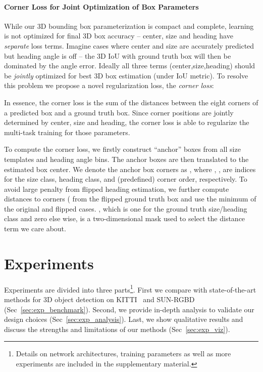\documentclass[10pt,twocolumn,letterpaper]{article}
\begin{document}
\paragraph{Corner Loss for Joint Optimization of Box Parameters}
While our 3D bounding box parameterization is compact and complete, learning is not optimized for final 3D box accuracy -- center, size and heading have \emph{separate} loss terms. Imagine cases where center and size are accurately predicted but heading angle is off -- the 3D IoU with ground truth box will then be dominated by the angle error. Ideally all three terms (center,size,heading) should be \emph{jointly} optimized for best 3D box estimation (under IoU metric).
To resolve this problem we propose a novel regularization loss, the \emph{corner loss}:

\vspace{-1mm}



In essence, the corner loss is the sum of the distances between the eight corners of a predicted box and a ground truth box. Since corner positions are jointly determined by center, size and heading, the corner loss is able to regularize the multi-task training for those parameters.


To compute the corner loss, we firstly construct  ``anchor'' boxes from all size templates and heading angle bins. The anchor boxes are then translated to the estimated box center. We denote the anchor box corners as , where , ,  are indices for the size class, heading class, and (predefined) corner order, respectively.
To avoid large penalty from flipped heading estimation, we further compute distances to corners ( from the flipped ground truth box and use the minimum of the original and flipped cases. , which is one for the ground truth size/heading class and zero else wise, is a two-dimensional mask used to select the distance term we care about.















%
 
\section{Experiments}
Experiments are divided into three parts\footnote{Details on network architectures, training parameters as well as more experiments are included in the supplementary material.}. First we compare with state-of-the-art methods for 3D object detection on KITTI~\cite{geiger2013vision} and SUN-RGBD~\cite{song2015sun} (Sec~\ref{sec:exp_benchmark}). Second, we provide in-depth analysis to validate our design choices (Sec~\ref{sec:exp_analysis}). Last, we show qualitative results and discuss the strengths and limitations of our methods (Sec~\ref{sec:exp_viz}).
\end{document}
